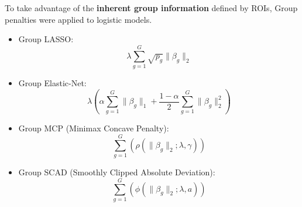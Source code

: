 \section*{}
\begin{flushleft}
To take advantage of the \textbf{inherent group information} defined by ROIs, Group penalties were applied to logistic models.
\end{flushleft}

    \centering 
    \begin{itemize}
    \item \small Group LASSO: 
    \[ \lambda \sum_{g=1}^{G} \sqrt{p_g} \| \beta_g \|_2 \]
    \item \small Group Elastic-Net: 
    \[ \lambda \left( \alpha \sum_{g=1}^{G} \| \beta_g \|_1 + \frac{1-\alpha}{2} \sum_{g=1}^{G} \| \beta_g \|_2^2 \right) \]
    \item \small Group MCP (Minimax Concave Penalty): 
    \[ \sum_{g=1}^{G} \left( \rho(\| \beta_g \|_2; \lambda, \gamma) \right) \]
    \item \small Group SCAD (Smoothly Clipped Absolute Deviation): 
    \[ \sum_{g=1}^{G} \left( \phi(\| \beta_g \|_2; \lambda, a) \right) \]
\end{itemize}

